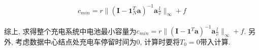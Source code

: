 \begin{eqnarray}
    c_{min} =r \| (\textbf{I}- \textbf{1}_N^T\textbf{a} )^{-1}\textbf{a} \frac{l}{v}\|_{\infty} +f
\end{eqnarray}

综上, 求得整个充电系统中电池最小容量为$ c_{min} =r \| (\textbf{I}- \textbf{1}^T\textbf{a} )^{-1}\textbf{a} \frac{l}{v}\|_{\infty} +f $. 另外, 考虑数据中心结点处充电车停留时间为0, 计算时要将$T_0 = 0$带入计算.








